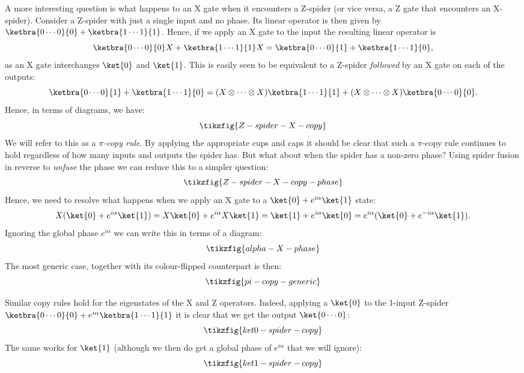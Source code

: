 \documentclass[a4paper,onecolumn,superscriptaddress,11pt,%
				unpublished,%
				allowfontchageintitle,%
				]{quantumarticle}
\begin{document}
A more interesting question is what happens to an X gate when it encounters a Z-spider (or vice versa, a Z gate that encounters an X-spider).
Consider a Z-spider with just a single input and no phase. Its linear operator is then given by $\ketbra{0 \cdots 0}{0} + \ketbra{1 \cdots 1}{1}$. Hence, if we apply an X gate to the input the resulting linear operator is 
$$\ketbra{0 \cdots 0}{0}X + \ketbra{1 \cdots 1}{1}X = \ketbra{0 \cdots 0}{1} + \ketbra{1 \cdots 1}{0},$$ 
as an X gate interchanges $\ket{0}$ and $\ket{1}$. This is easily seen to be equivalent to a Z-spider \emph{followed} by an X gate on each of the outputs:
$$\ketbra{0 \cdots 0}{1} + \ketbra{1 \cdots 1}{0} = (X\otimes\cdots\otimes X)\ketbra{1 \cdots 1}{1} + (X\otimes\cdots\otimes X)\ketbra{0 \cdots 0}{0}.$$
Hence, in terms of diagrams, we have:
\begin{equation}\label{eq:Z-spider-X-copy}
\tikzfig{Z-spider-X-copy}
\end{equation}
We will refer to this as a \emph{$\pi$-copy rule}.
By applying the appropriate cups and caps it should be clear that such a $\pi$-copy rule continues to hold regardless of how many inputs and outputs the spider has.
But what about when the spider has a non-zero phase?
Using spider fusion in reverse to \emph{unfuse} the phase we can reduce this to a simpler question:
\begin{equation}
\tikzfig{Z-spider-X-copy-phase}
\end{equation}
Hence, we need to resolve what happens when we apply an X gate to a $\ket{0}+e^{i\alpha}\ket{1}$ state:
\[X(\ket{0}+e^{i\alpha}\ket{1}) = X\ket{0}+e^{i\alpha}X\ket{1} = \ket{1} + e^{i\alpha} \ket{0} = e^{i\alpha}(\ket{0} + e^{-i\alpha}\ket{1}).\]
Ignoring the global phase $e^{i\alpha}$ we can write this in terms of a diagram:
\begin{equation}
\tikzfig{alpha-X-phase}
\end{equation}
The most generic case, together with its colour-flipped counterpart is then:
\begin{equation}\label{eq:pi-copy-generic}
\tikzfig{pi-copy-generic}
\end{equation}

Similar copy rules hold for the eigenstates of the X and Z operators. Indeed, applying a $\ket{0}$ to the 1-input Z-spider $\ketbra{0 \cdots 0}{0} + e^{i\alpha}\ketbra{1 \cdots 1}{1}$ it is clear that we get the output $\ket{0\cdots 0}$:
\begin{equation}\label{eq:ket0-spider-copy}
\tikzfig{ket0-spider-copy}
\end{equation}
The same works for $\ket{1}$ (although we then do get a global phase of $e^{i\alpha}$ that we will ignore):
\begin{equation}
\tikzfig{ket1-spider-copy}
\end{equation}
\end{document}

